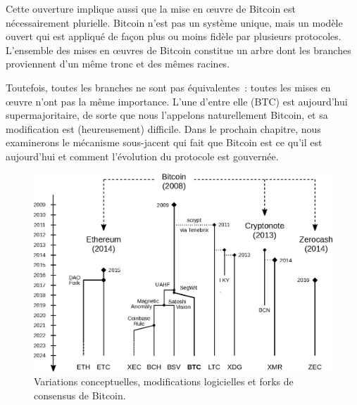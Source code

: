 Cette ouverture implique aussi que la mise en œuvre de Bitcoin est nécessairement plurielle. Bitcoin n'est pas un système unique, mais un modèle ouvert qui est appliqué de façon plus ou moins fidèle par plusieurs protocoles. L'ensemble des mises en œuvres de Bitcoin constitue un arbre dont les branches proviennent d'un même tronc et des mêmes racines.

Toutefois, toutes les branches ne sont pas équivalentes~: toutes les mises en œuvre n'ont pas la même importance. L'une d'entre elle (BTC) est aujourd'hui supermajoritaire, de sorte que nous l'appelons naturellement Bitcoin, et sa modification est (heureusement) difficile. Dans le prochain chapitre, nous examinerons le mécanisme sous-jacent qui fait que Bitcoin est ce qu'il est aujourd'hui et comment l'évolution du protocole est gouvernée.

\begin{figure}[h]
  \centering
  \includegraphics[scale=0.68]{img/bitcoin-forks-tree.eps}
  \caption{Variations conceptuelles, modifications logicielles et forks de consensus de Bitcoin.}
  \label{fig:bitcoin-forks-tree}
\end{figure}